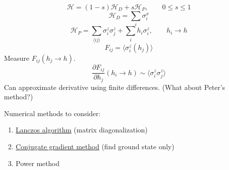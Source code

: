 \documentclass[a4paper]{article}
\newcommand{\ham}{\mathcal{H}}
\newcommand{\nn}[2]{\langle #1 #2 \rangle}
\newcommand{\av}[1]{\langle #1 \rangle}
\begin{document}
\begin{equation}
  \ham = (1 - s) \ham_D + s \ham_P,
  \qquad
  0 \leq s \leq 1
  \label{def-h_qaa}
\end{equation}
\begin{equation}
  \ham_D = \sum_i \sigma^x_i
  \label{def-h_d}
\end{equation}
\begin{equation}
  \ham_P = \sum_{\nn{i}{j}} \sigma^z_i \sigma^z_j + \sum_i h_i \sigma^z_i,
  \qquad
  h_i \rightarrow h
  \label{def-h_p}
\end{equation}
\begin{equation}
  F_{ij} = \av{ \sigma^z_i (h_j)}
  \label{def-f}
\end{equation}
Measure $F_{ij}(h_j \rightarrow h)$.
\begin{equation}
  \frac{\partial F_{ij}}{\partial h_j} (h_i \rightarrow h)
  \sim \av{\sigma^z_i \sigma^z_j}
  \label{}
\end{equation}
Can approximate derivative using finite differences. (What about Peter's
method?)

Numerical methods to consider:
\begin{enumerate}
  \item \href{http://en.wikipedia.org/wiki/Lanczos_algorithm}
    {Lanczos algorithm} (matrix diagonalization)
  \item \href{http://en.wikipedia.org/wiki/Conjugate_gradient_method}
    {Conjugate gradient method} (find ground state only)
  \item Power method
\end{enumerate}
\end{document}
